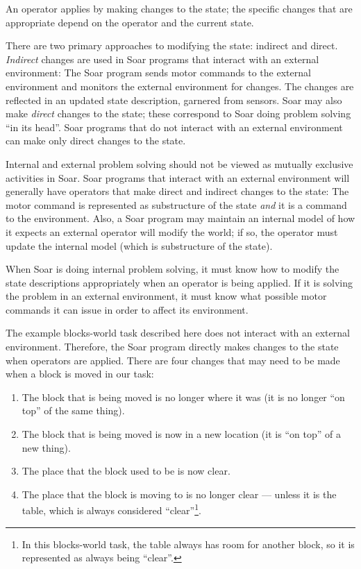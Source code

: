 An operator applies by making changes to the state; the specific changes
that are appropriate depend on the operator and the current state.

There are two primary approaches to modifying the state: indirect and direct.
\emph{Indirect} changes are used in Soar programs that interact with
an external environment: The Soar program sends motor commands to the
external environment and monitors the external environment for
changes. The changes are reflected in an updated state description,
garnered from sensors. Soar may also make \emph{direct} changes to the
state; these correspond to Soar doing problem solving ``in its
head''. Soar programs that do not interact with an external environment
can make only direct changes to the state.

Internal and external problem solving should not be viewed as mutually
exclusive activities in Soar. Soar programs that interact with an
external environment will generally have operators that make direct and
indirect changes to the state: The motor command is represented as
substructure of the state \emph{and} it is a command to the environment. Also, a Soar program may maintain an internal
model of how it expects an external operator will modify the world; if
so, the operator must update the internal model (which is substructure
of the state).

When Soar is doing internal problem solving, it must know how to modify
the state descriptions appropriately when an operator is being
applied. If it is solving the problem in an external environment, it
must know what possible motor commands it can issue in order to affect
its environment.

The example blocks-world task described here does not interact with an external
environment. Therefore, the Soar program directly makes changes to the state
when operators are applied. There are four changes that may need to be made
when a block is moved in our task: \vspace{-14pt}
\label{LIST:blocks-app}
\begin{enumerate}
\item The block that is being moved is no longer where it was (it is no longer
   	``on top'' of the same thing).\vspace{-6pt}
\item The block that is being moved is now in a new location (it is ``on top''
	of a new thing).\vspace{-6pt}
\item The place that the block used to be is now clear.\vspace{-6pt}
\item The place that the block is moving to is no longer clear --- unless it
	is the table, which is always considered ``clear''\footnote{In this
	blocks-world task, the table always has room for another block, so it
	is represented as always being ``clear''.}.
\end{enumerate}

